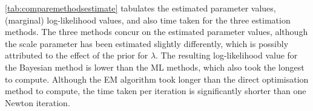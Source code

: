 \cref{tab:comparemethodsestimate} tabulates the estimated parameter values, (marginal) log-likelihood values, and also time taken for the three estimation methods.
The three methods concur on the estimated parameter values, although the scale parameter has been estimated slightly differently, which is possibly attributed to the effect of the prior for $\lambda$.
The resulting log-likelihood value for the Bayesian method is lower than the ML methods, which also took the longest to compute.
Although the EM algorithm took longer than the direct optimisation method to compute, the time taken per iteration is significantly shorter than one Newton iteration.
